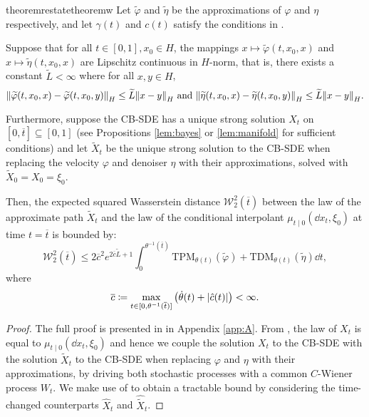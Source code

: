 \begin{restatable}{theorem}{restatetheoremw}\label{thm:w2}
  Let \(\widetilde{\varphi}\) and \(\widetilde{\eta}\) be the approximations of \(\varphi\) and \(\eta\) respectively, and let \(\gamma(t)\) and \(c(t)\) satisfy the conditions in .

  Suppose that for all \(t \in [0, 1], x_{0} \in H\), the mappings \(x \mapsto \widetilde{\varphi}(t, x_{0}, x)\) and \(x \mapsto \widetilde{\eta}(t, x_{0}, x)\) are Lipschitz continuous in \(H\)-norm, that is, there exists a constant \(\widetilde{L} < \infty\) where for all \(x, y \in H\),
  \[
    \norm{\widetilde{\varphi}(t, x_{0}, x) - \widetilde{\varphi}(t, x_{0}, y)}_{H} \leq \widetilde{L} \norm{x - y}_{H} \text{ and } \norm{\widetilde{\eta}(t, x_{0}, x) - \widetilde{\eta}(t, x_{0}, y)}_{H} \leq \widetilde{L} \norm{x - y}_{H}.
  \]

  Furthermore, suppose the CB-SDE has a unique strong solution \(X_{t}\) on \([0, \overline{t}] \subseteq [0, 1]\) (see Propositions \ref{lem:bayes} or \ref{lem:manifold} for sufficient conditions) and let \(\widetilde{X}_{t}\) be the unique strong solution to the CB-SDE when replacing the velocity \(\varphi\) and denoiser \(\eta\) with their approximations, solved with \(\widetilde{X}_{0} = X_{0} = \xi_{0}\).

  Then, the expected squared Wasserstein distance \(\mathcal{W}_{2}^{2}(\overline{t})\) between the law of the approximate path \(\widetilde{X}_{t}\) and the law of the conditional interpolant \(\mu_{t \mid 0}(\dd{x_{t}}, \xi_{0})\) at time \(t = \overline{t}\) is bounded by:
  \begin{equation}
    \mathcal{W}_{2}^{2}(\overline{t}) \leq 2\overline{c}^{2} e^{2 \overline{c} \widetilde{L} + 1} \int_{0}^{\theta^{-1}(\overline{t})} \mathrm{TPM}_{\theta(t)}(\widetilde{\varphi}) + \mathrm{TDM}_{\theta(t)}(\widetilde{\eta})\dd{t}, \label{eqn:w2}
  \end{equation}
  where
  \[
    \overline{c} \coloneqq \mathop{\underset{t \in [0, \theta^{-1}(\overline{t})]}{\max}} \qty(\dot{\theta}(t) + \abs{\hat{c}(t)}) < \infty.
  \]
\end{restatable}
\begin{proof} The full proof is presented in  in Appendix \ref{app:A}. From , the law of \(X_{t}\) is equal to \(\mu_{t \mid 0}(\dd{x_{t}}, \xi_{0})\) and hence we couple the solution \(X_{t}\) to the CB-SDE with the solution \(\widetilde{X}_{t}\) to the CB-SDE when replacing \(\varphi\) and \(\eta\) with their approximations, by driving both stochastic processes with a common \(C\)-Wiener process \(W_{t}\). We make use of  to obtain a tractable bound by considering the time-changed counterparts \(\hat{X}_{t}\) and \(\hat{\widetilde{X}}_{t}\).
\end{proof}

